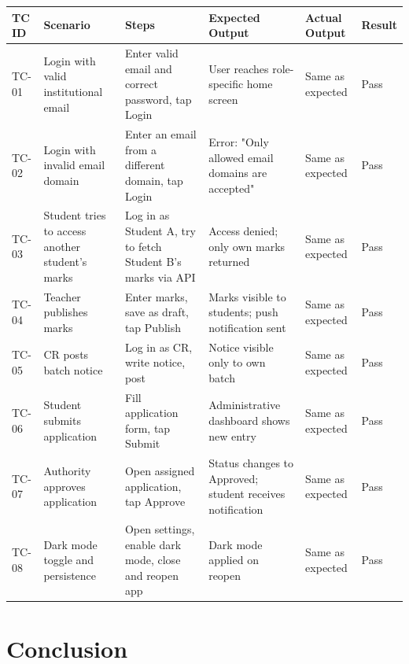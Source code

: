 \documentclass[12pt,a4paper]{article}
\newcommand{\THH}[1]{\small\bfseries\color{white} #1}
\begin{document}
\vspace{0.4em}
\begin{longtable}{|>{\centering\arraybackslash}p{1cm}|p{2.8cm}|p{3cm}|p{2.5cm}|p{2.5cm}|>{\centering\arraybackslash}p{1cm}|}
\hline
\rowcolor{navyblue}
\THH{TC ID} & \THH{Scenario} & \THH{Steps} & \THH{Expected Output} & \THH{Actual Output} & \THH{Result} \\
\hline
\endhead
TC-01 &
Login with valid institutional email &
Enter valid email and correct password, tap Login &
User reaches role-specific home screen &
Same as expected &
Pass \\
\hline
TC-02 &
Login with invalid email domain &
Enter an email from a different domain, tap Login &
Error: "Only allowed email domains are accepted" &
Same as expected &
Pass \\
\hline
TC-03 &
Student tries to access another student's marks &
Log in as Student A, try to fetch Student B's marks via API &
Access denied; only own marks returned &
Same as expected &
Pass \\
\hline
TC-04 &
Teacher publishes marks &
Enter marks, save as draft, tap Publish &
Marks visible to students; push notification sent &
Same as expected &
Pass \\
\hline
TC-05 &
CR posts batch notice &
Log in as CR, write notice, post &
Notice visible only to own batch &
Same as expected &
Pass \\
\hline
TC-06 &
Student submits application &
Fill application form, tap Submit &
Administrative dashboard shows new entry &
Same as expected &
Pass \\
\hline
TC-07 &
Authority approves application &
Open assigned application, tap Approve &
Status changes to Approved; student receives notification &
Same as expected &
Pass \\
\hline
TC-08 &
Dark mode toggle and persistence &
Open settings, enable dark mode, close and reopen app &
Dark mode applied on reopen &
Same as expected &
Pass \\
\hline
\end{longtable}
\newpage

\newpage
\section*{Conclusion}
\end{document}
